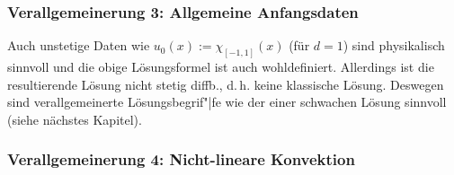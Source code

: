 \subsubsection{%
    Verallgemeinerung 3: Allgemeine Anfangsdaten%
}

\begin{Bem}
    Auch unstetige Daten wie $u_0(x) := \chi_{[-1,1]}(x)$ (für $d = 1$) sind physikalisch sinnvoll
    und die obige Lösungsformel ist auch wohldefiniert.
    Allerdings ist die resultierende Lösung nicht stetig diffb., d.\,h. keine klassische Lösung.
    Deswegen sind verallgemeinerte Lösungsbegrif"|fe wie der einer schwachen Lösung sinnvoll
    (siehe nächstes Kapitel).
\end{Bem}

\pagebreak

\subsubsection{%
    Verallgemeinerung 4: Nicht-lineare Konvektion%
}

